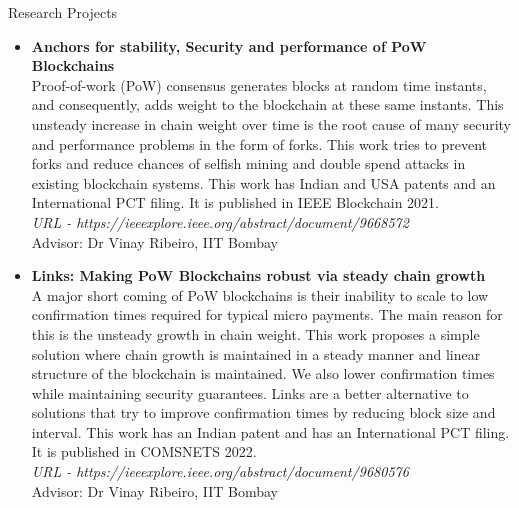 \documentclass{resume} %
\begin{document}
\begin{rSection}{Research Projects}
\begin{itemize}

\item\textbf{Anchors for stability, Security and performance of PoW Blockchains}\\
Proof-of-work (PoW) consensus generates blocks at random time instants, and consequently, adds weight to the blockchain at these same instants. This unsteady increase in chain weight over time is the root cause of many security and performance problems in the form of forks. This work tries to prevent forks and reduce chances of selfish mining and double spend attacks in existing blockchain systems. This work has Indian and USA patents and an International PCT filing. It is published in IEEE Blockchain 2021.\\
	\textit{URL - https://ieeexplore.ieee.org/abstract/document/9668572}\\
Advisor: Dr Vinay Ribeiro, IIT Bombay

\item\textbf{Links: Making PoW Blockchains robust via steady chain growth}\\
A major short coming of PoW blockchains is their inability to scale to low confirmation times required for typical micro payments. The main reason for this is the unsteady growth in chain weight. This work proposes a simple solution where chain growth is maintained in a steady manner and linear structure of the blockchain is maintained. We also lower confirmation times while maintaining security guarantees.
Links are a better alternative to solutions that try to improve confirmation times by reducing block size and interval.
This work has an Indian patent and has an International PCT filing. It is published in COMSNETS 2022.\\
\textit{URL - https://ieeexplore.ieee.org/abstract/document/9680576}\\
Advisor: Dr Vinay Ribeiro, IIT Bombay




\end{itemize}
\end{rSection}
\end{document}
